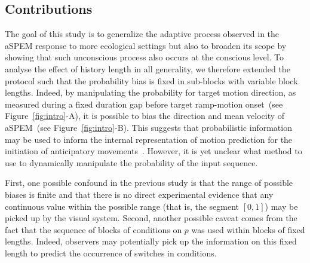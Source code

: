 \documentclass[12pt,english]{article}%
\newcommand{\citep}[1]{\parencite{#1}}
\newcommand{\seeFig}[1]{Figure~\ref{fig:#1}}
\newcommand{\seeSec}[1]{Section~\ref{sec:#1}}
\begin{document}
\subsection{Contributions}%
The goal of this study is to generalize the adaptive process
observed in the aSPEM response to more ecological settings but
also to broaden its scope by showing that such unconscious process
also occurs at the conscious level.
To analyse the effect of history length in all generality,
we therefore extended the protocol such that the probability bias
is fixed in sub-blocks with variable block lengths.
Indeed, by manipulating the probability for target motion direction,
as measured during a fixed duration gap
before target ramp-motion onset~(see \seeFig{intro}-A),
it is possible to bias the direction and mean velocity of aSPEM~(see \seeFig{intro}-B).
This suggests that probabilistic information may be used
to inform the internal representation of motion prediction
for the initiation of anticipatory movements~\citep{Montagnini2010}.
However, it is yet unclear what method to use
to dynamically manipulate the probability of the input sequence.

First, one possible confound in the previous study
is that the range of possible biases is finite and
that there is no direct experimental evidence that
any continuous value within the possible range (that is, the segment $[ 0, 1 ]$)
may be picked up by the visual system.
Second, another possible caveat comes from the fact that the sequence of blocks of conditions on $p$
was used within blocks of fixed lengths.
Indeed, observers may potentially pick up
the information on this fixed length
to predict the occurrence of switches in conditions.
\end{document}
